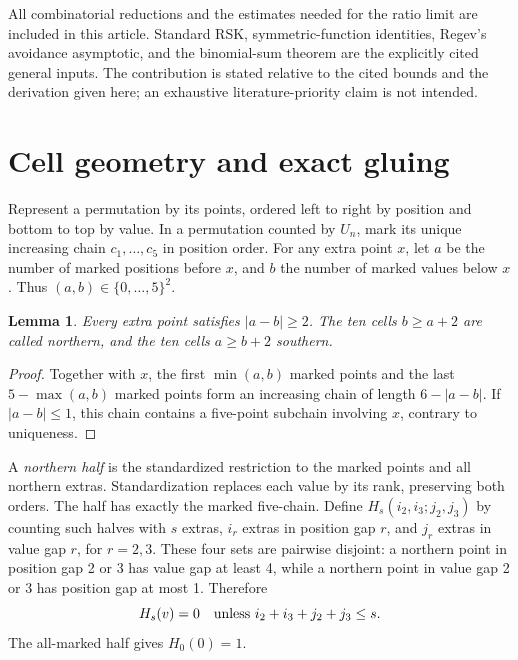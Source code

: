 \documentclass[11pt,letterpaper]{article}
\newtheorem{lemma}[theorem]{Lemma}
\theoremstyle{remark}\newtheorem{remark}[theorem]{Remark}
\numberwithin{equation}{section}
\begin{document}
All combinatorial reductions and the estimates needed for the ratio
limit are included in this article. Standard RSK, symmetric-function
identities, Regev's avoidance asymptotic, and the binomial-sum theorem
are the explicitly cited general inputs. The contribution is stated
relative to the cited bounds and the derivation given here; an
exhaustive literature-priority claim is not intended.

\section{Cell geometry and exact gluing}\label{upo:ex5:sec:glue}
Represent a permutation by its points, ordered left to right by
position and bottom to top by value. In a permutation counted by $U_n$,
mark its unique increasing chain $c_1,\ldots,c_5$ in position order.
For any extra point $x$, let $a$ be the number of marked positions
before $x$, and $b$ the number of marked values below $x$. Thus
$(a,b)\in\{0,\ldots,5\}^2$.

\begin{lemma}\label{upo:ex5:lem:cells}
Every extra point satisfies $|a-b|\ge2$. The ten cells $b\ge a+2$
are called northern, and the ten cells $a\ge b+2$ southern.
\end{lemma}
\begin{proof}
Together with $x$, the first $\min(a,b)$ marked points and the last
$5-\max(a,b)$ marked points form an increasing chain of length
$6-|a-b|$. If $|a-b|\le1$, this chain contains a five-point
subchain involving $x$, contrary to uniqueness.
\end{proof}

A \emph{northern half} is the standardized restriction to the marked
points and all northern extras. Standardization replaces each value
by its rank, preserving both orders. The half has exactly the marked
five-chain. Define $H_s(i_2,i_3;j_2,j_3)$ by counting such halves with
$s$ extras, $i_r$ extras in position gap $r$, and $j_r$ extras in value
gap $r$, for $r=2,3$. These four sets are pairwise disjoint: a northern
point in position gap 2 or 3 has value gap at least 4, while a northern
point in value gap 2 or 3 has position gap at most 1. Therefore
\begin{equation}\label{upo:ex5:eq:support}
 H_s(v)=0\quad\hbox{unless }i_2+i_3+j_2+j_3\le s.
\end{equation}
The all-marked half gives $H_0(0)=1$.
\end{document}
